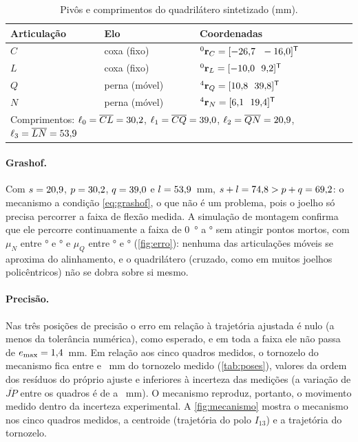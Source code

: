 \documentclass[12pt,a4paper,twoside]{article}
\newcommand{\rv}[2]{{}^{#1}\mathbf{r}_{#2}}          %
\numberwithin{equation}{section}
\begin{document}
\begin{table}[htbp]
  \centering
  \caption{Pivôs e comprimentos do quadrilátero sintetizado (mm).}
  \label{tab:pivos}
  \begin{tabular}{lll}
    \toprule
    Articulação & Elo & Coordenadas \\
    \midrule
    $C$ & coxa (fixo) & $\rv{0}{C} = [\Cx\ \ \Cy]^{\mathsf T}$ \\
    $L$ & coxa (fixo) & $\rv{0}{L} = [\Lx\ \ \Ly]^{\mathsf T}$ \\
    $Q$ & perna (móvel) & $\rv{4}{Q} = [\Qx\ \ \Qy]^{\mathsf T}$ \\
    $N$ & perna (móvel) & $\rv{4}{N} = [\Nx\ \ \Ny]^{\mathsf T}$ \\
    \midrule
    \multicolumn{3}{l}{Comprimentos: $\ell_0 = \overline{CL} = 30{,}2$, $\ell_1 = \overline{CQ} = 39{,}0$, $\ell_2 = \overline{QN} = 20{,}9$, $\ell_3 = \overline{LN} = 53{,}9$} \\
    \bottomrule
  \end{tabular}
\end{table}

\paragraph{Grashof.} Com $s=20{,}9$, $p=30{,}2$, $q=39{,}0$ e $l=53{,}9$~mm,
$s+l=74{,}8 > p+q=69{,}2$: o mecanismo \grashof{} a condição
\eqref{eq:grashof}, o que não é um problema, pois o joelho só precisa percorrer a faixa de
flexão medida. A simulação de montagem confirma que ele percorre continuamente a faixa de
\SI{0}{\degree} a \phimax\si{\degree} sem atingir pontos mortos, com $\mu_N$ entre
\mumin\si{\degree} e \mumax\si{\degree} e $\mu_Q$ entre \muQmin\si{\degree} e
\muQmax\si{\degree} (\cref{fig:erro}): nenhuma das articulações móveis se aproxima do
alinhamento, e o quadrilátero (cruzado, como em muitos joelhos policêntricos) não se dobra
sobre si mesmo.

\paragraph{Precisão.} Nas três posições de precisão o erro em relação à trajetória ajustada é
nulo (a menos da tolerância numérica), como esperado, e em toda a faixa ele não passa de
$e_{\max} = 1{,}4$~mm. Em relação aos cinco quadros medidos, o tornozelo do mecanismo fica
entre \emedmin{} e \emedmax~mm do tornozelo medido (\cref{tab:poses}), valores da ordem dos
resíduos do próprio ajuste e inferiores à incerteza das medições (a variação de
$\overline{JP}$ entre os quadros é de \JPmin{} a \JPmax~mm). O mecanismo reproduz, portanto, o
movimento medido dentro da incerteza experimental. A \cref{fig:mecanismo} mostra o
mecanismo nos cinco quadros medidos, a centroide (trajetória do polo $I_{13}$) e a
trajetória do tornozelo.
\end{document}
